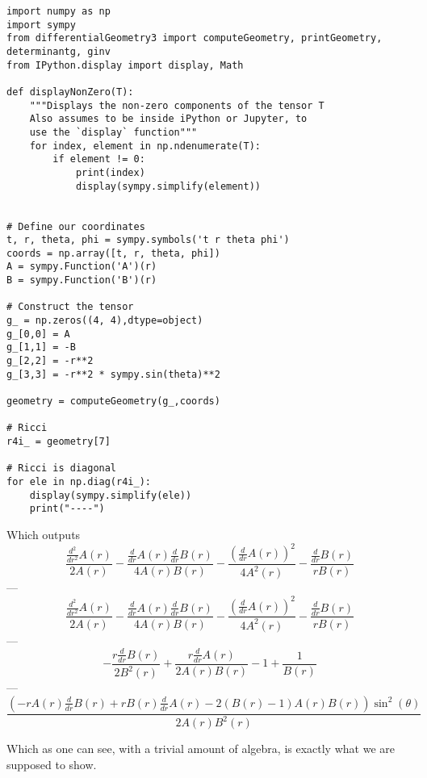 \documentclass{article}
\begin{document}
\begin{lstlisting}
import numpy as np
import sympy
from differentialGeometry3 import computeGeometry, printGeometry, determinantg, ginv
from IPython.display import display, Math

def displayNonZero(T):
    """Displays the non-zero components of the tensor T
    Also assumes to be inside iPython or Jupyter, to
    use the `display` function"""
    for index, element in np.ndenumerate(T):
        if element != 0:
            print(index)
            display(sympy.simplify(element))


# Define our coordinates
t, r, theta, phi = sympy.symbols('t r theta phi')
coords = np.array([t, r, theta, phi])
A = sympy.Function('A')(r)
B = sympy.Function('B')(r)

# Construct the tensor
g_ = np.zeros((4, 4),dtype=object)
g_[0,0] = A
g_[1,1] = -B
g_[2,2] = -r**2
g_[3,3] = -r**2 * sympy.sin(theta)**2

geometry = computeGeometry(g_,coords)

# Ricci
r4i_ = geometry[7]

# Ricci is diagonal
for ele in np.diag(r4i_):
    display(sympy.simplify(ele))
    print("----")
\end{lstlisting}
Which outputs
$$
\displaystyle \frac{\frac{d^{2}}{d r^{2}} A{\left(r \right)}}{2 A{\left(r \right)}} - \frac{\frac{d}{d r} A{\left(r \right)} \frac{d}{d r} B{\left(r \right)}}{4 A{\left(r \right)} B{\left(r \right)}} - \frac{\left(\frac{d}{d r} A{\left(r \right)}\right)^{2}}{4 A^{2}{\left(r \right)}} - \frac{\frac{d}{d r} B{\left(r \right)}}{r B{\left(r \right)}}
$$
---
$$
\displaystyle \frac{\frac{d^{2}}{d r^{2}} A{\left(r \right)}}{2 A{\left(r \right)}} - \frac{\frac{d}{d r} A{\left(r \right)} \frac{d}{d r} B{\left(r \right)}}{4 A{\left(r \right)} B{\left(r \right)}} - \frac{\left(\frac{d}{d r} A{\left(r \right)}\right)^{2}}{4 A^{2}{\left(r \right)}} - \frac{\frac{d}{d r} B{\left(r \right)}}{r B{\left(r \right)}}
$$
---
$$
\displaystyle - \frac{r \frac{d}{d r} B{\left(r \right)}}{2 B^{2}{\left(r \right)}} + \frac{r \frac{d}{d r} A{\left(r \right)}}{2 A{\left(r \right)} B{\left(r \right)}} - 1 + \frac{1}{B{\left(r \right)}}
$$
---
$$
\displaystyle \frac{\left(- r A{\left(r \right)} \frac{d}{d r} B{\left(r \right)} + r B{\left(r \right)} \frac{d}{d r} A{\left(r \right)} - 2 \left(B{\left(r \right)} - 1\right) A{\left(r \right)} B{\left(r \right)}\right) \sin^{2}{\left(\theta \right)}}{2 A{\left(r \right)} B^{2}{\left(r \right)}}
$$

Which as one can see, with a trivial amount of algebra, is exactly what we are supposed to show.
\end{document}
